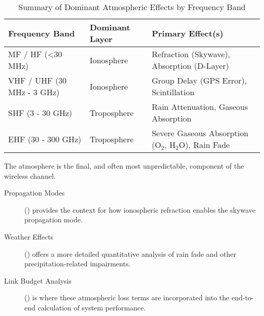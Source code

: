 \begin{table}[H]
    \centering
    \caption{Summary of Dominant Atmospheric Effects by Frequency Band}
    \label{tab:atmospheric-effects-summary}
    \begin{tabular}{@{}lll@{}}
        \toprule
        \tableheaderfont Frequency Band & \tableheaderfont Dominant Layer & \tableheaderfont Primary Effect(s) \\
        \midrule
        MF / HF (<30 MHz) & Ionosphere & Refraction (Skywave), Absorption (D-Layer) \\
        VHF / UHF (30 MHz - 3 GHz) & Ionosphere & Group Delay (GPS Error), Scintillation \\
        SHF (3 - 30 GHz) & Troposphere & Rain Attenuation, Gaseous Absorption \\
        EHF (30 - 300 GHz) & Troposphere & Severe Gaseous Absorption (O$_2$, H$_2$O), Rain Fade \\
        \bottomrule
    \end{tabular}
\end{table}


\begin{importantbox}[title={Further Reading}]
    The atmosphere is the final, and often most unpredictable, component of the wireless channel.
    \begin{description}
        \item[Propagation Modes] () provides the context for how ionospheric refraction enables the skywave propagation mode.
        \item[Weather Effects] () offers a more detailed quantitative analysis of rain fade and other precipitation-related impairments.
        \item[Link Budget Analysis] () is where these atmospheric loss terms are incorporated into the end-to-end calculation of system performance.
    \end{description}
\end{importantbox}
